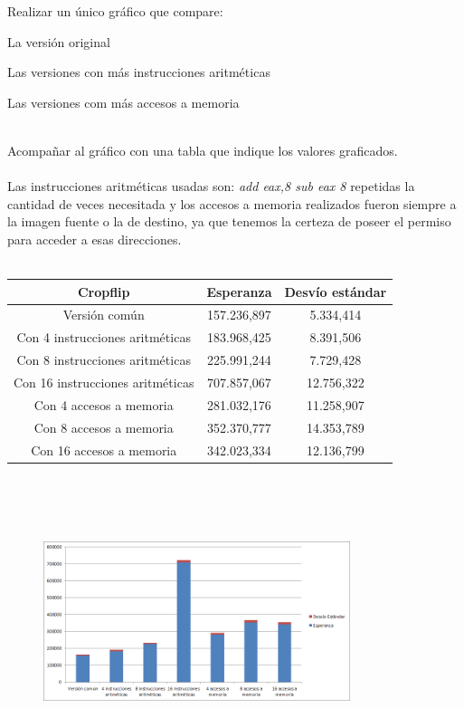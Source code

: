 Realizar un único gráfico que compare:
\begin{inparaenum}
    \item La versión original
    \item Las versiones con más instrucciones aritméticas
    \item Las versiones com más accesos a memoria
\end{inparaenum}
\\
Acompañar al gráfico con una tabla que indique los valores graficados. \\
\\
Las instrucciones aritm\'eticas usadas son:  \emph{add eax,8 sub eax 8} repetidas la cantidad de veces necesitada y los accesos a memoria realizados fueron siempre a la imagen fuente o la de destino, ya que tenemos la certeza de poseer el permiso para acceder a esas direcciones.\\
\\
 \begin{tabular}[c]{|c|c|c|}
	\hline
		Cropflip & Esperanza & Desv\'io est\'andar\\
		\hline
Versi\'on com\'un & 157.236,897 & 5.334,414 \\
\hline
Con 4 instrucciones aritméticas & 183.968,425 & 8.391,506 \\
\hline
Con 8 instrucciones aritméticas & 225.991,244 & 7.729,428 \\
\hline
Con 16 instrucciones aritméticas & 707.857,067 & 12.756,322 \\
\hline
Con 4 accesos a memoria & 281.032,176 & 11.258,907 \\
\hline
Con 8 accesos a memoria & 352.370,777 & 14.353,789 \\
\hline
Con 16 accesos a memoria & 342.023,334 & 12.136,799 \\
\hline
	\end{tabular}\\\\
\\

\begin{figure}[h!]
  \begin{center}
	\includegraphics[width=0.8\textwidth]{imagenes/15}
  \end{center}
\end{figure}

